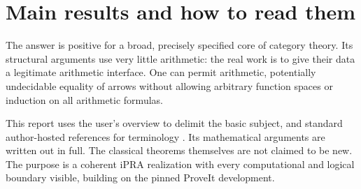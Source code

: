 \section{Main results and how to read them}\label{sec:overview}

The answer is positive for a broad, precisely specified core of category
theory. Its structural arguments use very little arithmetic: the real work
is to give their data a legitimate arithmetic interface. One can permit
arithmetic, potentially undecidable equality of arrows without allowing
arbitrary function spaces or induction on all arithmetic formulas.

This report uses the user's overview \cite{wiki} to delimit the basic
subject, and standard author-hosted references for terminology
\cite{riehl,awodey}. Its mathematical arguments are written out in full.
The classical theorems themselves are not claimed to be new. The purpose
is a coherent iPRA realization with every computational and logical
boundary visible, building on the pinned ProveIt development.

